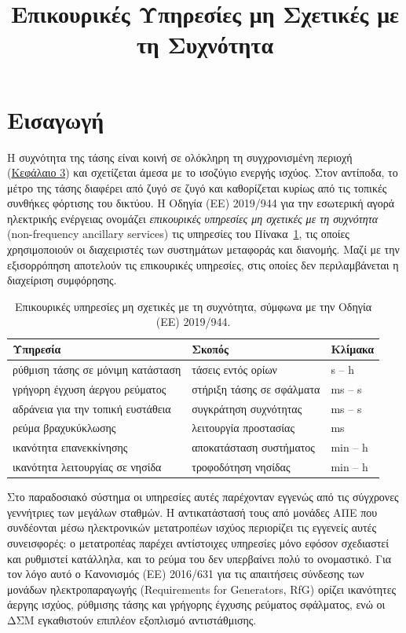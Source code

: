 \title{Επικουρικές Υπηρεσίες μη Σχετικές με τη Συχνότητα}

\section{Εισαγωγή}
\label{kef-02-theoria}
Η συχνότητα της τάσης είναι κοινή σε ολόκληρη τη συγχρονισμένη περιοχή (\hyperref[kef-03-theoria]{Κεφάλαιο 3}) και σχετίζεται άμεσα με το ισοζύγιο ενεργής ισχύος. Στον αντίποδα, το μέτρο της τάσης διαφέρει από ζυγό σε ζυγό και καθορίζεται κυρίως από τις τοπικές συνθήκες φόρτισης του δικτύου. 
Η Οδηγία (ΕΕ) 2019/944 για την εσωτερική αγορά ηλεκτρικής ενέργειας ονομάζει \emph{επικουρικές υπηρεσίες μη σχετικές με τη συχνότητα}
(non-frequency ancillary services) τις υπηρεσίες του Πίνακα~\ref{tab:nfas}, τις οποίες
χρησιμοποιούν οι διαχειριστές των συστημάτων μεταφοράς και διανομής. Μαζί με την εξισορρόπηση
αποτελούν τις επικουρικές υπηρεσίες, στις οποίες δεν περιλαμβάνεται η διαχείριση συμφόρησης.

\begin{table}[!htbp]
\centering
\begin{tabular}{lll}
\hline
Υπηρεσία & Σκοπός & Κλίμακα \\
\hline
ρύθμιση τάσης σε μόνιμη κατάσταση & τάσεις εντός ορίων & s -- h \\
γρήγορη έγχυση άεργου ρεύματος & στήριξη τάσης σε σφάλματα & ms -- s \\
αδράνεια για την τοπική ευστάθεια & συγκράτηση συχνότητας & ms -- s \\
ρεύμα βραχυκύκλωσης & λειτουργία προστασίας & ms \\
ικανότητα επανεκκίνησης & αποκατάσταση συστήματος & min -- h \\
ικανότητα λειτουργίας σε νησίδα & τροφοδότηση νησίδας & min -- h \\
\hline
\end{tabular}
\caption{Επικουρικές υπηρεσίες μη σχετικές με τη συχνότητα, σύμφωνα με την Οδηγία (ΕΕ)
2019/944.}
\label{tab:nfas}
\end{table}

Στο παραδοσιακό σύστημα οι υπηρεσίες αυτές παρέχονταν εγγενώς από τις σύγχρονες γεννήτριες
των μεγάλων σταθμών. Η αντικατάστασή τους από μονάδες ΑΠΕ που συνδέονται μέσω ηλεκτρονικών
μετατροπέων ισχύος περιορίζει τις εγγενείς αυτές συνεισφορές: ο μετατροπέας παρέχει αντίστοιχες
υπηρεσίες μόνο εφόσον σχεδιαστεί και ρυθμιστεί κατάλληλα, και το ρεύμα του δεν υπερβαίνει
πολύ το ονομαστικό. Για τον λόγο αυτό ο Κανονισμός (ΕΕ) 2016/631 για τις απαιτήσεις σύνδεσης
των μονάδων ηλεκτροπαραγωγής (Requirements for Generators, RfG) ορίζει ικανότητες άεργης
ισχύος, ρύθμισης τάσης και γρήγορης έγχυσης ρεύματος σφάλματος, ενώ οι ΔΣΜ εγκαθιστούν
επιπλέον εξοπλισμό αντιστάθμισης.

